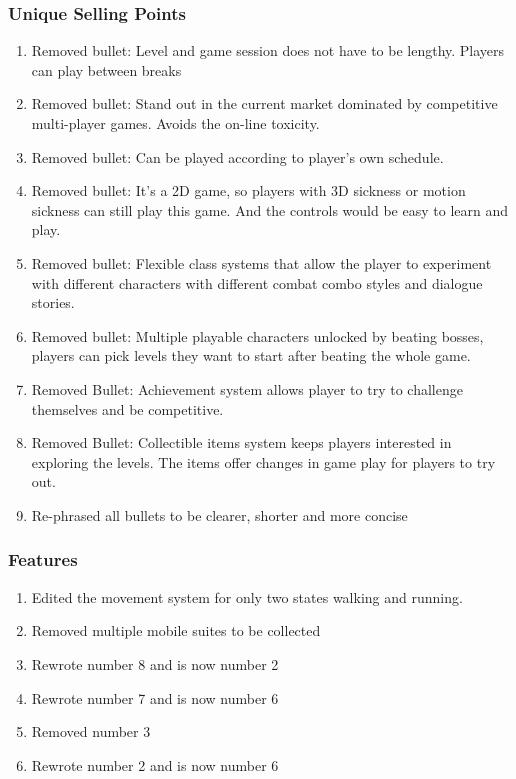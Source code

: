 \documentclass[]{article}
\begin{document}
\subsubsection*{Unique Selling Points}
\begin{enumerate}
	\item Removed bullet: Level and game session does not have to be lengthy. Players can play between breaks
	\item Removed bullet: Stand out in the current market dominated by competitive multi-player games. Avoids the on-line toxicity.
	\item Removed bullet: Can be played according to player’s own schedule.
	\item Removed bullet: It’s a 2D game, so players with 3D sickness or motion sickness can still play this game. And the controls would be easy to learn and play.
	\item Removed bullet: Flexible class systems that allow the player to experiment with different characters with different combat combo styles and dialogue stories.
	\item Removed bullet: Multiple playable characters unlocked by beating bosses, players can pick levels they want to start after beating the whole game.
	\item Removed Bullet:  Achievement system allows player to try to challenge themselves and be competitive.
	\item Removed Bullet: Collectible items system keeps players interested in exploring the levels. The items offer changes in game play for players to try out.
	\item Re-phrased all bullets to be clearer, shorter and more concise 
\end{enumerate}
\subsubsection*{Features}
\begin{enumerate}
	\item Edited the movement system for only two states walking and running.
	\item Removed multiple mobile suites to be collected 
	\item Rewrote number 8 and is now number 2 
	\item Rewrote number 7 and is now number 6	
	\item Removed number 3 
	\item Rewrote number 2 and is now number 6
\end{enumerate}
\end{document}
